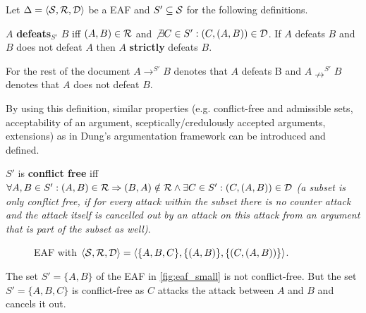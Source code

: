 Let $\Delta = \langle \S, \R, \D \rangle$ be a \gls{EAF} and $S' \subseteq \S$ for the following definitions.

\begin{definition}
$A$ \textbf{defeats$_{S'}$} $B$ iff $(A, B) \in \R$ and $\not \exists C \in S': (C, (A, B)) \in \D$. If $A$ defeats $B$ and $B$ does not defeat $A$ then $A$ \textbf{strictly} defeats $B$.
\end{definition}

\begin{notation}
For the rest of the document $A \rightarrow^{S'} B$ denotes that $A$ defeats B and $A \nrightarrow^{S'} B$ denotes that $A$ does not defeat $B$.
\end{notation}


By using this definition, similar properties (e.g. conflict-free and admissible sets, acceptability of an argument, sceptically/credulously accepted arguments, extensions) as in Dung's argumentation framework can be introduced and defined.

\begin{definition}
	$S'$ is \textbf{conflict free} iff $\forall A, B \in S': (A, B) \in \R \Rightarrow (B, A) \notin \R \wedge \exists C \in S': (C, (A, B)) \in \D$ \textit{(a subset is only conflict free, if for every attack within the subset there is no counter attack and the attack itself is cancelled out by an attack on this attack from an argument that is part of the subset as well)}.
\end{definition}


\begin{figure}[h]
\centering
{}
\caption{\gls{EAF} with $\langle \S, \R, \D \rangle = \langle \{A, B, C\}, \{(A, B)\}, \{(C, (A, B))\} \rangle$.}
\label{fig:eaf_small}
\end{figure}

\begin{exa}
	The set $S' = \{A, B\}$ of the \gls{EAF} in \autoref{fig:eaf_small} is not conflict-free. But the set $S' = \{A, B, C\}$ is conflict-free as $C$ attacks the attack between $A$ and $B$ and cancels it out.
\end{exa}

